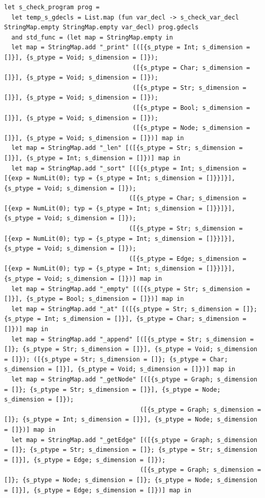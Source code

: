 \documentclass[a4paper,12pt]{article}
\begin{document}
\begin{lstlisting}
let s_check_program prog =
  let temp_s_gdecls = List.map (fun var_decl -> s_check_var_decl StringMap.empty StringMap.empty var_decl) prog.gdecls 
  and std_func = (let map = StringMap.empty in 
  let map = StringMap.add "_print" [([{s_ptype = Int; s_dimension = []}], {s_ptype = Void; s_dimension = []}); 
                                   ([{s_ptype = Char; s_dimension =  []}], {s_ptype = Void; s_dimension = []}); 
                                   ([{s_ptype = Str; s_dimension = []}], {s_ptype = Void; s_dimension = []});
                                   ([{s_ptype = Bool; s_dimension = []}], {s_ptype = Void; s_dimension = []});
                                   ([{s_ptype = Node; s_dimension = []}], {s_ptype = Void; s_dimension = []})] map in
  let map = StringMap.add "_len" [([{s_ptype = Str; s_dimension = []}], {s_ptype = Int; s_dimension = []})] map in
  let map = StringMap.add "_sort" [([{s_ptype = Int; s_dimension = [{exp = NumLit(0); typ = {s_ptype = Int; s_dimension = []}}]}], {s_ptype = Void; s_dimension = []});
                                  ([{s_ptype = Char; s_dimension = [{exp = NumLit(0); typ = {s_ptype = Int; s_dimension = []}}]}], {s_ptype = Void; s_dimension = []});
                                  ([{s_ptype = Str; s_dimension = [{exp = NumLit(0); typ = {s_ptype = Int; s_dimension = []}}]}], {s_ptype = Void; s_dimension = []});
                                  ([{s_ptype = Edge; s_dimension = [{exp = NumLit(0); typ = {s_ptype = Int; s_dimension = []}}]}], {s_ptype = Void; s_dimension = []})] map in 
  let map = StringMap.add "_empty" [([{s_ptype = Str; s_dimension = []}], {s_ptype = Bool; s_dimension = []})] map in
  let map = StringMap.add "_at" [([{s_ptype = Str; s_dimension = []}; {s_ptype = Int; s_dimension = []}], {s_ptype = Char; s_dimension = []})] map in
  let map = StringMap.add "_append" [([{s_ptype = Str; s_dimension = []}; {s_ptype = Str; s_dimension = []}], {s_ptype = Void; s_dimension = []}); ([{s_ptype = Str; s_dimension = []}; {s_ptype = Char; s_dimension = []}], {s_ptype = Void; s_dimension = []})] map in
  let map = StringMap.add "_getNode" [([{s_ptype = Graph; s_dimension = []}; {s_ptype = Str; s_dimension = []}], {s_ptype = Node; s_dimension = []});
                                     ([{s_ptype = Graph; s_dimension = []}; {s_ptype = Int; s_dimension = []}], {s_ptype = Node; s_dimension = []})] map in
  let map = StringMap.add "_getEdge" [([{s_ptype = Graph; s_dimension = []}; {s_ptype = Str; s_dimension = []}; {s_ptype = Str; s_dimension = []}], {s_ptype = Edge; s_dimension = []});
                                     ([{s_ptype = Graph; s_dimension = []}; {s_ptype = Node; s_dimension = []}; {s_ptype = Node; s_dimension = []}], {s_ptype = Edge; s_dimension = []})] map in

\end{lstlisting}
\end{document}
